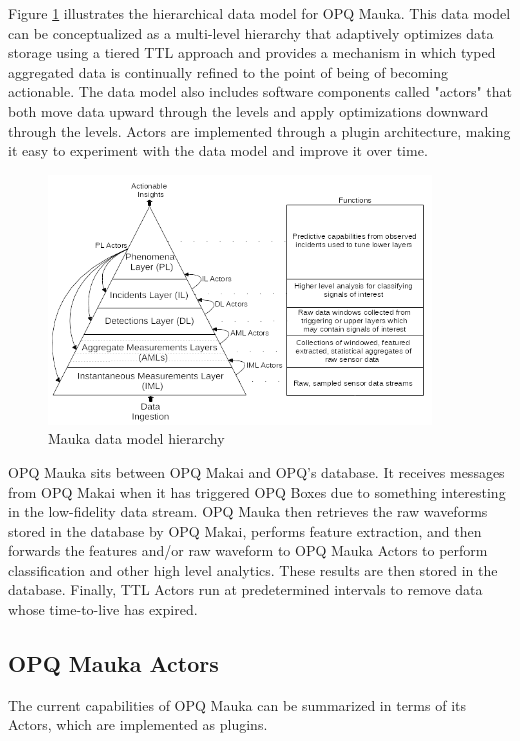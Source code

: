 Figure \ref{fig:mauka-data-model} illustrates the hierarchical data model for OPQ Mauka. This data model can be conceptualized as a multi-level hierarchy that adaptively optimizes data storage using a tiered TTL approach and provides a mechanism in which typed aggregated data is continually refined to the point of being of becoming actionable. The data model also includes software components called "actors" that both move data upward through the levels and apply optimizations downward through the levels. Actors are implemented through a plugin architecture, making it easy to experiment with the data model and improve it over time.

\begin{figure}
\center \includegraphics[width=4in]{images/mauka/mauka-data-model.png}
\caption{Mauka data model hierarchy}
\label{fig:mauka-data-model}
\end{figure}

OPQ Mauka sits between OPQ Makai and OPQ’s database. It receives messages from OPQ Makai when it has triggered OPQ Boxes due to something interesting in the low-fidelity data stream. OPQ Mauka then retrieves the raw waveforms stored in the database by OPQ Makai, performs feature extraction, and then forwards the features and/or raw waveform to OPQ Mauka Actors to perform classification and other high level analytics. These results are then stored in the database. Finally, TTL Actors run at predetermined intervals to remove data whose time-to-live has expired.

\subsection{OPQ Mauka Actors}

The current capabilities of OPQ Mauka can be summarized in terms of its Actors, which are implemented as plugins.


